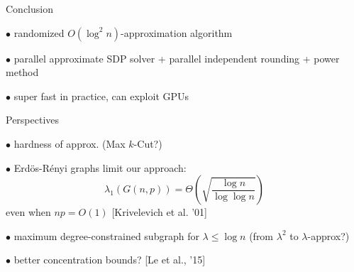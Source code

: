 \documentclass[14pt]{beamer}
\begin{document}
\begin{frame}{Conclusion}
\begin{fullpageitemize}
\item $\bullet$ randomized $O(\log^2 n)$-approximation algorithm
\item $\bullet$ parallel approximate SDP solver + parallel independent rounding + power method
\item $\bullet$ super fast in practice, can exploit GPUs
\item 
\end{fullpageitemize}
\end{frame}

\begin{frame}{Perspectives}
\begin{fullpageitemize}
\item $\bullet$ hardness of approx. (Max $k$-Cut?)
\item $\bullet$ Erd\"os-R\'enyi graphs limit our approach:
\begin{equation*}
    \lambda_1(G(n,p)) = \Theta\left(\sqrt{\dfrac{\log n}{\log \log n}} \right)
\end{equation*}
even when $np = O(1)$ {\small[Krivelevich et al. '01]}
\item $\bullet$ maximum degree-constrained subgraph for $\lambda \leq \log n$ (from $\lambda^2$ to $\lambda$-approx?)
\item $\bullet$ better concentration bounds? {\small[Le et al., '15]}
\end{fullpageitemize}
\end{frame}




\end{document}
